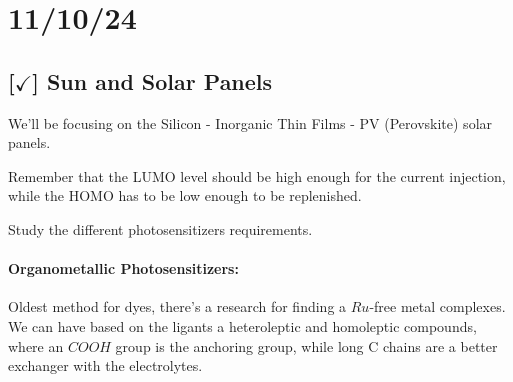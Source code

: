 \section{11/10/24}

\subsection{[$\checkmark$] Sun and Solar Panels}

We'll be focusing on the Silicon - Inorganic Thin Films - PV (Perovskite) solar panels.

\vspace{10pt}

Remember that the LUMO level should be high enough for the current injection, while the HOMO has to be low enough to be replenished.

\vspace{10pt}

Study the different photosensitizers requirements.

\vspace{10pt}

\paragraph{Organometallic Photosensitizers:} Oldest method for dyes, there's a research for finding a $Ru$-free metal complexes. We can have based on the ligants a heteroleptic and homoleptic compounds, where an $COOH$ group is the anchoring group, while long C chains are a better exchanger with the electrolytes.